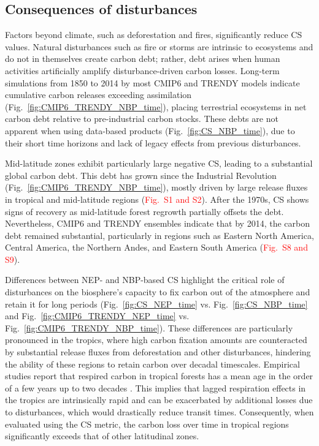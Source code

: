 \documentclass[ProofPDF]{./Styles/Jnls-Template-V3}
\begin{document}
\subsection{Consequences of disturbances}
Factors beyond climate, such as deforestation and fires, significantly reduce CS values. Natural disturbances such as fire or storms are intrinsic to ecosystems and do not in themselves create carbon debt; rather, debt arises when human activities artificially amplify disturbance-driven carbon losses. Long-term simulations from 1850 to 2014 by most CMIP6 and TRENDY models indicate cumulative carbon releases exceeding assimilation (Fig.~\ref{fig:CMIP6_TRENDY_NBP_time}), placing terrestrial ecosystems in net carbon debt relative to pre-industrial carbon stocks. These debts are not apparent when using data-based products (Fig.~\ref{fig:CS_NBP_time}), due to their short time horizons and lack of legacy effects from previous disturbances. 

Mid-latitude zones exhibit particularly large negative CS, leading to a substantial global carbon debt. This debt has grown since the Industrial Revolution (Fig.~\ref{fig:CMIP6_TRENDY_NBP_time}), mostly driven by large release fluxes in tropical and mid-latitude regions (\textcolor{red}{Fig.~S1 and S2}). After the 1970s, CS shows signs of recovery as mid-latitude forest regrowth partially offsets the debt. 
Nevertheless, CMIP6 and TRENDY ensembles indicate that by 2014, the carbon debt remained substantial, particularly in regions such as Eastern North America, Central America, the Northern Andes, and Eastern South America (\textcolor{red}{Fig.~S8 and S9}).

Differences between NEP- and NBP-based CS highlight the critical role of disturbances on the biosphere's capacity to fix carbon out of the atmosphere and retain it for long periods (Fig.~\ref{fig:CS_NEP_time} vs. Fig.~\ref{fig:CS_NBP_time} and Fig.~\ref{fig:CMIP6_TRENDY_NEP_time} vs. Fig.~\ref{fig:CMIP6_TRENDY_NBP_time}). These differences are particularly pronounced in the tropics, where high carbon fixation amounts are counteracted by substantial release fluxes from deforestation and other disturbances, hindering the ability of these regions to retain carbon over decadal timescales. Empirical studies report that respired carbon in tropical forests has a mean age in the order of a few years up to two decades \citep{Sierra2021JE,Chanca2025}. This implies that lagged respiration effects in the tropics are intrinsically rapid and can be exacerbated by additional losses due to disturbances, which would drastically reduce transit times. Consequently, when evaluated using the CS metric, the carbon loss over time in tropical regions significantly exceeds that of other latitudinal zones. 
\end{document}
